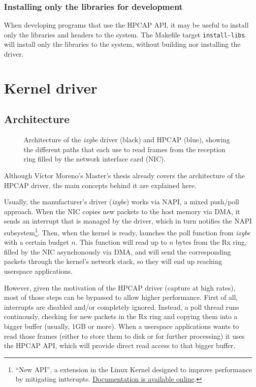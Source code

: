 \documentclass[oneside]{hpman}
\begin{document}
\subsection{Installing only the libraries for development}

When developing programs that use the HPCAP API, it may be useful to install only the libraries and headers to the system. The Makefile target \texttt{install-libs} will install only the libraries to the system, without building nor installing the driver.

\chapter{Kernel driver}

\section{Architecture}

\begin{figure}[hbtp]
\centering

\caption{Architecture of the \textit{ixgbe} driver (black) and HPCAP (blue), showing the different paths that each use to read frames from the reception ring filled by the network interface card (NIC).}
\label{fig:DriverArch}
\end{figure}

Although V\'ictor Moreno's Master's thesis \cite{MorenoTFM2012} already covers the architecture of the HPCAP driver, the main concepts behind it are explained here.

Usually, the manufacturer's driver (\textit{ixgbe}) works via NAPI, a mixed push/poll approach. When the NIC copies new packets to the host memory via DMA, it sends an interrupt that is managed by the driver, which in turn notifies the NAPI subsystem\footnote{``New API'', a extension in the Linux Kernel designed to improve performance by mitigating intterupts. \href{http://www.linuxfoundation.org/collaborate/workgroups/networking/napi}{Documentation is available online}.}. Then, when the kernel is ready, launches the poll function from \textit{ixgbe} with a certain budget $n$. This function will read up to $n$ bytes from the Rx ring, filled by the NIC asynchonously via DMA, and will send the corresponding packets through the kernel's network stack, so they will end up reaching userspace applications.

However, given the motivation of the HPCAP driver (capture at high rates), most of those steps can be bypassed to allow higher performance. First of all, interrupts are disabled and/or completely ignored. Instead, a poll thread runs continously, checking for new packets in the Rx ring and copying them into a bigger buffer (usually, 1GB or more). When a userspace applications wants to read those frames (either to store them to disk or for further processing) it uses the HPCAP API, which will provide direct read access to that bigger buffer.
\end{document}
